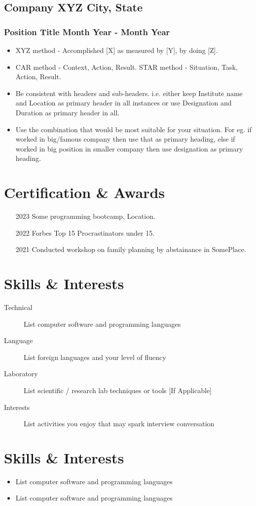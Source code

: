 \documentclass[11pt]{article} %
\begin{document}
\subsection{Company XYZ \hfill City, State}
\subsubsection{Position Title \hfill Month Year - Month Year}
\begin{itemize}
    \item XYZ method - Accomplished [X] as measured by [Y], by doing [Z].
    \item CAR method - Context, Action, Result. STAR method - Situation, Task, Action, Result.
    \item Be consistent with headers and sub-headers. i.e. either keep Institute name and Location as primary header in all instances or use Designation and Duration as primary header in all.
    \item Use the combination that would be most suitable for your situation. For eg. if worked in big/famous company then use that as primary heading, else if worked in big position in smaller company then use designation as primary heading.
\end{itemize}

\section{Certification \& Awards}
\begin{enumerate}[itemsep=0pt]
  \item [2023] Some programming bootcamp, Location.
  \item [2022] Forbes Top 15 Procrastinators under 15.
  \item [2021] Conducted workshop on family planning by abstainance in SomePlace.
\end{enumerate}

\section{Skills \& Interests}
\begin{description}%
    \item[Technical] List computer software and programming languages 
    \item[Language] List foreign languages and your level of fluency
    \item[Laboratory] List scientific / research lab techniques or tools [If Applicable]
    \item[Interests] List activities you enjoy that may spark interview conversation
\end{description}


\section{Skills \& Interests}
\begin{itemize}%
    \item List computer software and programming languages 
    \item List computer software and programming languages 
\end{itemize}
\end{document}
